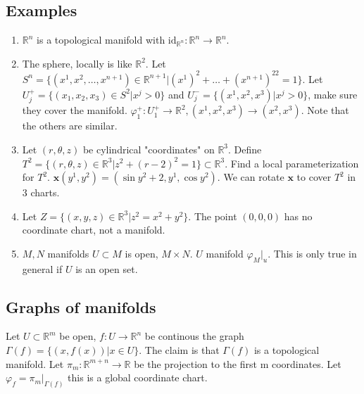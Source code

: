 \documentclass[a4paper]{article}
\begin{document}
\subsection*{Examples}
\begin{enumerate}
    \item
    $\mathds{R}^n$ is a topological manifold with $\text{id}_{\mathds{R}^n}: \mathds{R}^n \rightarrow \mathds{R}^n$. 
    \item
        The sphere, locally is like $\mathds{R}^2$. Let $S^n = \{(x^1, x^2, \dots, x^{n+1}) \in \mathds{R}^{n+1} | (x^1)^2 + \dots + (x^{n+1})^22 = 1\}$. Let $U_j^+  = \{(x_1, x_2, x_3) \in S^2 | x^j > 0\}$ and $U_j^- = \{(x^1, x^2, x^3) | x^j > 0\}$, make sure they cover the manifold. $\varphi_1^+: U_1^+ \rightarrow \mathds{R}^2, (x^1, x^2, x^3) \rightarrow (x^2, x^3)$. Note that the others are similar.
    \item Let $(r, \theta, z)$ be cylindrical "coordinates" on $\mathds{R}^3$. Define $T^2 = \{(r,\theta, z) \in \mathds{R}^3 | z^2 + (r-2)^2 = 1\} \subset \mathds{R}^3$. Find a local parameterization for $T^2$. $\mathbf{x}(y^1,y^2) = (\sin y^2 + 2,y^1, \cos y^2)$. We can rotate $\mathbf{x}$ to cover $T^2$ in 3 charts.
    \item Let $Z = \{(x,y,z) \in \mathds{R}^3 | z^2 = x^2 + y^2\}.$ The point $(0,0,0)$ has no coordinate chart, not a manifold.
    \item $M,N$ manifolds $U \subset M$  is open, $M \times N$. $U$ manifold  $\varphi_M|_u$. This is only true in general if $U$ is an open set.
\end{enumerate}

\subsection*{Graphs of manifolds}
Let $U \subset \mathds{R}^m$ be open, $f: U \rightarrow \mathds{R}^n$ be continous the graph $\Gamma(f) = \{(x, f(x)) | x \in U\}$. The claim is that $\Gamma(f)$ is a topological manifold. Let $\pi_m : \mathds{R}^{m+n} \rightarrow \mathds{R}$ be the projection to the first m coordinates. Let $\varphi_f = \pi_m |_{\Gamma(f)}$ this is a global coordinate chart.
\end{document}
